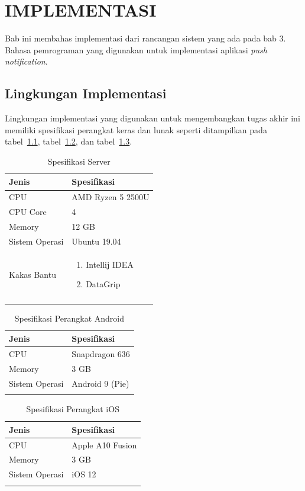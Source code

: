 \chapter {IMPLEMENTASI}
\par Bab ini membahas implementasi dari rancangan sistem yang ada pada bab 3. Bahasa pemrograman yang digunakan untuk implementasi aplikasi \textit{push notification}.

\section{Lingkungan Implementasi}
\par Lingkungan implementasi yang digunakan untuk mengembangkan tugas akhir ini memiliki spesifikasi perangkat keras dan lunak seperti ditampilkan pada tabel~\ref{tabel_spesifikasi_server}, tabel~\ref{tabel_spesifikasi_perangkat_android}, dan tabel~\ref{tabel_spesifikasi_perangkat_ios}.
\begin{longtable}{|p{2.5cm}|p{6.5cm}|}
    \hline
    \textbf{Jenis} & \textbf{Spesifikasi} \\ \hline
    CPU & AMD Ryzen 5 2500U \\ \hline
    CPU Core & 4 \\ \hline
    Memory & 12 GB \\ \hline
    Sistem Operasi & Ubuntu 19.04 \\ \hline
    Kakas Bantu &
    \begin{enumerate}
        \item Intellij IDEA
        \item DataGrip
    \end{enumerate} \\ \hline
    \caption{Spesifikasi Server}
    \label{tabel_spesifikasi_server}
\end{longtable}
\begin{longtable}{|p{2.5cm}|p{6.5cm}|}
    \hline
    \textbf{Jenis} & \textbf{Spesifikasi} \\ \hline
    CPU & Snapdragon 636 \\ \hline
    Memory & 3 GB \\ \hline
    Sistem Operasi & Android 9 (Pie) \\ \hline
    \caption{Spesifikasi Perangkat Android}
    \label{tabel_spesifikasi_perangkat_android}
\end{longtable}
\begin{longtable}{|p{2.5cm}|p{6.5cm}|}
    \hline
    \textbf{Jenis} & \textbf{Spesifikasi} \\ \hline
    CPU & Apple A10 Fusion \\ \hline
    Memory & 3 GB \\ \hline
    Sistem Operasi & iOS 12 \\ \hline
    \caption{Spesifikasi Perangkat iOS}
    \label{tabel_spesifikasi_perangkat_ios}
\end{longtable}

